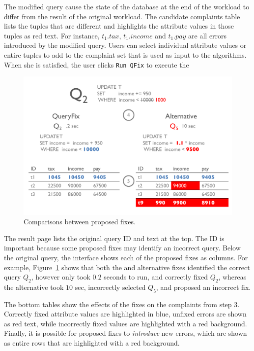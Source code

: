 The modified query cause the state of the database at the end of the workload
to differ from the result of the original workload.  The candidate complaints table lists the tuples
that are different and highlights the attribute values in those tuples as red text.  For instance,
$t_1.tax$, $t_1.income$ and $t_1.pay$ are all errors introduced by the modified query. 
Users can select individual attribute values or entire tuples to add to the complaint set that is used as input to the \sys algorithms.  
When she is satisfied, the user clicks \texttt{Run QFix} to execute the 


\begin{figure}[t]
\centering
  \includegraphics[width = .9\columnwidth]{figures/demo2_exp2}
  \vspace*{-0.2in}
  \caption{Comparisons between proposed fixes.}
  \label{f:demo2} 
  \vspace*{-.2in}
\end{figure}


  The result page lists the original query ID and text at the top.  The ID 
is important because some proposed fixes may identify an incorrect query.  Below the original query,
the interface shows each of the proposed fixes as columns.  For example, Figure~\ref{f:demo2} shows 
that both the \sys and alternative fixes identified the correct query $Q_2$, however \sys only took $0.2$ seconds
to run, and correctly fixed $Q_2$, whereas the alternative took $10$ sec, 
incorrectly selected $Q_5$, and proposed an incorrect fix.

 The bottom tables show the effects of the fixes on the complaints from
step 3.  Correctly fixed attribute values are highlighted in blue, unfixed errors are shown as red text, while incorrectly
fixed values are highlighted with a red background.  Finally, it is possible for proposed fixes to 
{\it introduce} new errors, which are shown as entire rows that are highlighted with a red background.







